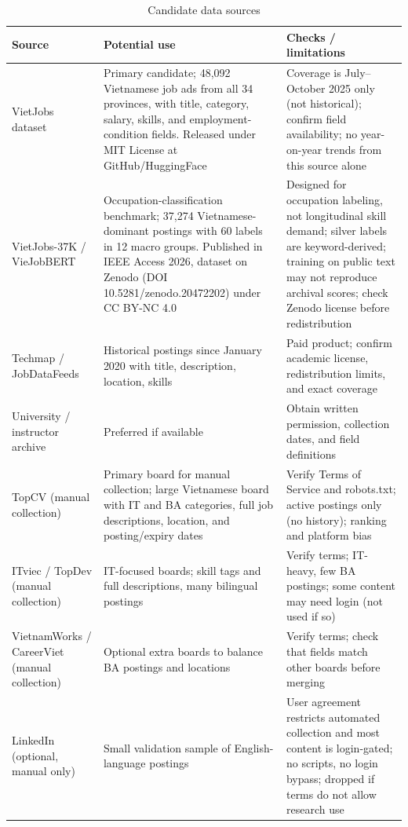 \documentclass[12pt,a4paper]{article}
\begin{document}
\begin{table}[H]
\centering\small
\caption{Candidate data sources}
\label{tab:sources}
\begin{tabularx}{\textwidth}{@{}P{3.3cm}LL@{}}
\toprule
\textbf{Source} & \textbf{Potential use} & \textbf{Checks / limitations} \\
\midrule
VietJobs dataset~\cite{vietjobs} & Primary candidate; 48{,}092
  Vietnamese job ads from all 34 provinces, with title, category,
  salary, skills, and employment-condition fields. Released under
  MIT License at GitHub/HuggingFace &
  Coverage is July--October 2025 only (not historical); confirm
  field availability; no year-on-year trends from this source alone \\
\addlinespace
VietJobs-37K / VieJobBERT~\cite{viejobbert} & Occupation-classification
  benchmark; 37{,}274 Vietnamese-dominant postings with 60 labels in
  12 macro groups. Published in IEEE Access 2026, dataset on Zenodo
  (DOI 10.5281/zenodo.20472202) under CC BY-NC 4.0 &
  Designed for occupation labeling, not longitudinal skill demand;
  silver labels are keyword-derived; training on public text may not
  reproduce archival scores; check Zenodo license before redistribution \\
\addlinespace
Techmap / JobDataFeeds~\cite{techmap} & Historical postings since January
  2020 with title, description, location, skills & Paid product; confirm
  academic license, redistribution limits, and exact coverage \\
\addlinespace
University / instructor archive & Preferred if available & Obtain written
  permission, collection dates, and field definitions \\
\addlinespace
TopCV (manual collection) & Primary board for manual collection; large
  Vietnamese board with IT and BA categories, full job descriptions,
  location, and posting/expiry dates & Verify Terms of Service and
  robots.txt; active postings only (no history); ranking and platform bias
  \\
\addlinespace
ITviec / TopDev (manual collection) & IT-focused boards; skill tags and
  full descriptions, many bilingual postings & Verify terms; IT-heavy, few
  BA postings; some content may need login (not used if so) \\
\addlinespace
VietnamWorks / CareerViet (manual collection) & Optional extra boards to
  balance BA postings and locations & Verify terms; check that fields
  match other boards before merging \\
\addlinespace
LinkedIn (optional, manual only) & Small validation sample of
  English-language postings & User agreement restricts automated
  collection and most content is login-gated; no scripts, no login bypass;
  dropped if terms do not allow research use \\
\bottomrule
\end{tabularx}
\end{table}
\end{document}
